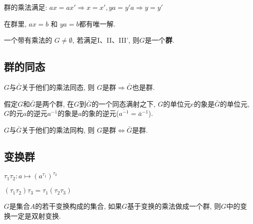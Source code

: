 \begin{Theorem}
群的乘法满足: $ax = ax' \Rightarrow x = x', ya = y'a \Rightarrow y = y'$
\end{Theorem}

\begin{Corollary}
在群里, $ax = b$ 和 $ya = b$都有唯一解.
\end{Corollary}

\begin{Theorem}[有限群的另一定义]
一个带有乘法的   $G \neq \emptyset$, 若满足I、II、III', 则$G$是一个\textbf{群}.
\end{Theorem}

\subsection{群的同态}

\begin{Theorem}
$G$与$\bar{G}$关于他们的乘法同态, 则 $G$是群$\Rightarrow \bar{G}$也是群.
\end{Theorem}

\begin{Theorem}
假定$G$和$\bar{G}$是两个群, 在$G$到$\bar{G}$的一个同态满射之下, $G$的单位元$e$的象是$\bar{G}$的单位元, $G$的元$a$的逆元$a^{-1}$的象是$a$的象的逆元($\overline{a^{-1}} = \bar{a}^{-1}$).
\end{Theorem}

\begin{Theorem}
$G$与$\bar{G}$关于他们的乘法同构, 则 $G$是群$\Leftrightarrow \bar{G}$是群.
\end{Theorem}

\subsection{变换群} %

\begin{Definition}[变换的乘法]
$\tau_1 \tau_2: a \mapsto {\left(a^{\tau_1}\right)}^{\tau_2}$
\end{Definition}

\begin{Theorem}[变换乘法结合]
$(\tau_1 \tau_2) \tau_3 = \tau_1 ( \tau_2 \tau_3 )$
\end{Theorem}

\begin{Theorem}
$G$是集合$A$的若干变换构成的集合, 如果$G$基于变换的乘法做成一个群,
则$G$中的变换一定是双射变换.
\end{Theorem}

